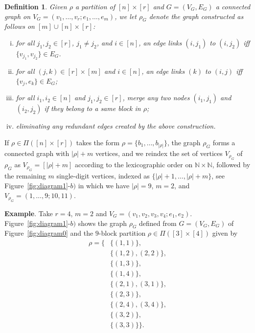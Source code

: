\documentclass[12pt]{article}
\newcommand{\inte}{\mathbb{N}}
\newtheorem{definition}[prop]{Definition}
\numberwithin{equation}{section}
\begin{document}
\begin{definition}
   \label{fjklf}
   Given $\rho$ a partition of $[n]\times[r]$
   and $G=(V_G,E_G)$ a connected graph 
   on $V_G=(v_1, \ldots ,v_r; e_1,\ldots , e_m)$, 
   we let $\rho_G$ denote the graph 
   constructed as follows on $[m] \cup [n]\times [r]$:
\begin{enumerate}[i)]  
\item for all $j_1, j_2\in [r]$, $j_1\not= j_2$, and $i\in [n]$, 
  an edge links $(i,j_1)$ to $(i,j_2)$
  iff $\{v_{j_1},v_{j_2}\}\in E_G$. 
\item for all $(j,k)\in [r]\times [m]$ and $i\in [n]$, an edge
  links $(k)$ to $(i,j)$ iff $\{v_j,e_k\}\in E_G$; 
\item for all $i_1,i_2\in [n]$
  and $j_1,j_2\in [r]$,
  merge any two nodes $(i_1,j_1)$ and $(i_2,j_2)$ 
  if they belong to a same block in $\rho$;  
\item eliminating any redundant edges created by the above construction.
\end{enumerate}
\end{definition}
\noindent
 If $\rho\in\Pi ([n]\times[r])$
 takes the form $\rho = \{ b_1,\ldots , b_{|\rho |}\}$, 
 the graph $\rho_G$ forms a connected graph with
 $|\rho | + m$ vertices, and we reindex the set of vertices $V_{\rho_G}$
 of $\rho_G$  
 as $V_{\rho_G}=[|\rho | + m ]$ according to the lexicographic order
 on $\inte \times \inte$, 
 followed by the remaining $m$ single-digit vertices, 
 indexed as $\{|\rho |+1,\ldots , |\rho | +m\}$,
 see Figure~\ref{fig:diagram1}-$b)$
 in which we have $|\rho | =9$, $m = 2$, and $V_{\rho_G}=(1,\dots ,9;10, 11)$. 

 \medskip

 \noindent
{\bf Example}. 
Take $r=4$, $m=2$ and $V_G=(v_1, v_2,v_3,v_4;e_1,e_2)$. 
 Figure~\ref{fig:diagram1}-$b)$  
 shows the graph $\rho_G$ defined from 
 $G=(V_G,E_G)$ of Figure~\ref{fig:diagram0}
 and the $9$-block partition $\rho \in \Pi ([3]\times[4])$
 given by 
 \begin{align*}
   \rho = \big\{ & \{(1,1)\},
   \\
   & \{(1,2),(2,2)\},
      \\
   & \{(1,3)\},
   \\
   & \{(1,4)\},
   \\
   & \{(2,1),(3,1)\},
   \\
   & \{(2,3)\},
   \\
   & \{(2,4),(3,4)\},
   \\
   & \{(3,2)\},
   \\
   & \{(3,3)\}\big\}. 
\end{align*} 
 
\end{document}
